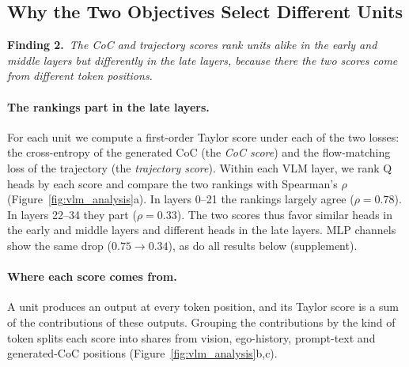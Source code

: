 

\subsection{Why the Two Objectives Select Different Units}
\label{sec:vlm_analysis}

\noindent\textbf{Finding 2.}\ \emph{The CoC and trajectory scores rank units
alike in the early and middle layers but differently in the late layers, because
there the two scores come from different token positions.}

\paragraph{The rankings part in the late layers.}
For each unit we compute a first-order Taylor score under each of the two
losses: the cross-entropy of the generated CoC (the \emph{CoC score}) and the
flow-matching loss of the trajectory (the \emph{trajectory score}).
Within each VLM layer, we rank Q heads by each score and compare the two
rankings with Spearman's $\rho$ (Figure~\ref{fig:vlm_analysis}a).
In layers 0--21 the rankings largely agree ($\rho=0.78$). In layers 22--34 they
part ($\rho=0.33$).
The two scores thus favor similar heads in the early and middle layers and
different heads in the late layers.
MLP channels show the same drop ($0.75\to0.34$), as do all results below
(supplement).

\paragraph{Where each score comes from.}
A unit produces an output at every token position, and its Taylor score is a sum
of the contributions of these outputs. Grouping the contributions by the kind of
token splits each score into shares from vision, ego-history, prompt-text and
generated-CoC positions (Figure~\ref{fig:vlm_analysis}b,c).

